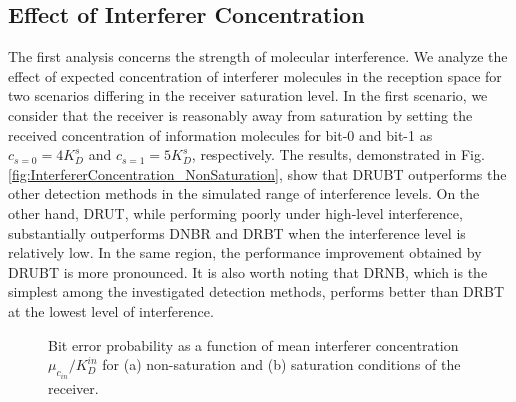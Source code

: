\documentclass[twocolumn]{IEEEtran}
\begin{document}
\subsection{Effect of Interferer Concentration}
The first analysis concerns the strength of molecular interference. We analyze the effect of expected concentration of interferer molecules in the reception space for two scenarios differing in the receiver saturation level. In the first scenario, we consider that the receiver is reasonably away from saturation by setting the received concentration of information molecules for bit-0 and bit-1 as $c_{s=0} = 4K_D^s$ and $c_{s=1} = 5K_D^s$, respectively. The results, demonstrated in Fig. \ref{fig:InterfererConcentration_NonSaturation}, show that DRUBT outperforms the other detection methods in the simulated range of interference levels. On the other hand, DRUT, while performing poorly under high-level interference, substantially outperforms DNBR and DRBT when the interference level is relatively low. In the same region, the performance improvement obtained by DRUBT is more pronounced. It is also worth noting that DRNB, which is the simplest among the investigated detection methods, performs better than DRBT at the lowest level of interference. 
\begin{figure*}[!t]
	\centering
	\caption{Bit error probability as a function of mean interferer concentration $\mu_{c_{in}}/K_D^{in}$ for (a) non-saturation and (b) saturation conditions of the receiver.}
	\label{fig:InterfererConcentrationMain}
\end{figure*}
\end{document}
